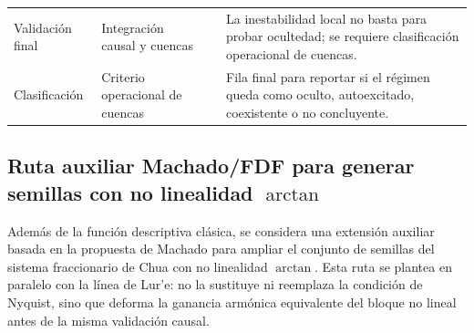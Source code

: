 \documentclass[journal]{IEEEtran}
\begin{document}
\begin{table}[htbp]
\begin{adjustbox}{max width=\textwidth}
\begin{tabular}{@{}L{2.7cm}L{3.4cm}L{4.4cm}L{5.8cm}@{}}
Validación final &
Integración causal y cuencas &
 &
La inestabilidad local no basta para probar ocultedad; se requiere clasificación operacional de cuencas. \\

Clasificación &
Criterio operacional de cuencas &
 &
Fila final para reportar si el régimen queda como oculto, autoexcitado, coexistente o no concluyente. \\

\bottomrule
\end{tabular}
\end{adjustbox}
\end{table}

\subsection{Ruta auxiliar Machado/FDF para generar semillas con no linealidad \texorpdfstring{\(\arctan\)}{arctan}}

Además de la función descriptiva clásica, se considera una extensión auxiliar
basada en la propuesta de Machado para ampliar el conjunto de semillas del
sistema fraccionario de Chua con no linealidad \(\arctan\). Esta ruta se
plantea en paralelo con la línea de Lur'e: no la sustituye ni reemplaza la
condición de Nyquist, sino que deforma la ganancia armónica equivalente del
bloque no lineal antes de la misma validación causal.
\end{document}
